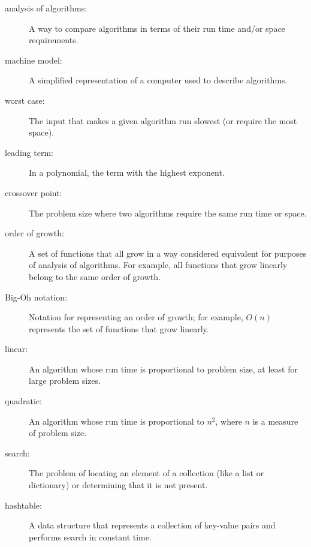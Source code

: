 \documentclass[10pt]{book}
\begin{document}
\begin{description}

\item[analysis of algorithms:] A way to compare algorithms in terms of
their run time and/or space requirements.

\item[machine model:] A simplified representation of a computer used
to describe algorithms.

\item[worst case:] The input that makes a given algorithm run slowest (or
require the most space).

\item[leading term:] In a polynomial, the term with the highest exponent.

\item[crossover point:] The problem size where two algorithms require
the same run time or space. 

\item[order of growth:] A set of functions that all grow in a way
considered equivalent for purposes of analysis of algorithms. 
For example, all functions that grow linearly belong to the same
order of growth.

\item[Big-Oh notation:] Notation for representing an order of growth;
for example, $O(n)$ represents the set of functions that grow
linearly. 

\item[linear:] An algorithm whose run time is proportional to
problem size, at least for large problem sizes.

\item[quadratic:] An algorithm whose run time is proportional to
$n^2$, where $n$ is a measure of problem size.

\item[search:] The problem of locating an element of a collection
(like a list or dictionary) or determining that it is not present.

\item[hashtable:] A data structure that represents a collection of
key-value pairs and performs search in constant time.

\end{description}


\printindex

\clearemptydoublepage
\end{document}
